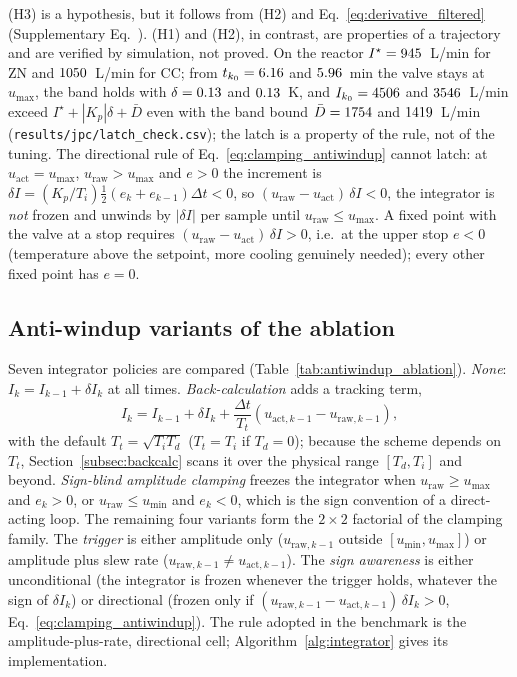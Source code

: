 (H3) is a hypothesis, but it follows from (H2) and Eq.~\eqref{eq:derivative_filtered} (Supplementary Eq.~). (H1) and (H2), in contrast, are properties of a trajectory and are verified by simulation, not proved. On the reactor $I^\star = 945$~L/min for ZN and $1050$~L/min for CC; from $t_{k_0} = 6.16$ and $5.96$~min the valve stays at $u_{\max}$, the band holds with $\delta = 0.13$ and $0.13$~K, and $I_{k_0} = 4506$ and $3546$~L/min exceed $I^\star + |K_p|\delta + \bar D$ even with the band bound $\bar D = 1754$ and $1419$~L/min (\texttt{results/jpc/latch\_check.csv}); the latch is a property of the rule, not of the tuning. The directional rule of Eq.~\eqref{eq:clamping_antiwindup} cannot latch: at $u_{\text{act}} = u_{\max}$, $u_{\text{raw}} > u_{\max}$ and $e > 0$ the increment is $\delta I = (K_p/T_i)\tfrac12(e_k + e_{k-1})\Delta t < 0$, so $(u_{\text{raw}} - u_{\text{act}})\,\delta I < 0$, the integrator is \emph{not} frozen and unwinds by $|\delta I|$ per sample until $u_{\text{raw}} \le u_{\max}$. A fixed point with the valve at a stop requires $(u_{\text{raw}} - u_{\text{act}})\,\delta I > 0$, i.e.\ at the upper stop $e < 0$ (temperature above the setpoint, more cooling genuinely needed); every other fixed point has $e = 0$.

\subsection{Anti-windup variants of the ablation}
\label{subsec:aw_variants}
Seven integrator policies are compared (Table~\ref{tab:antiwindup_ablation}). \emph{None}: $I_k = I_{k-1} + \delta I_k$ at all times. \emph{Back-calculation} \cite{astrom1989windup, galeani2009tutorial} adds a tracking term,
\begin{equation}
    I_k = I_{k-1} + \delta I_k + \frac{\Delta t}{T_t}\left(u_{\text{act},k-1} - u_{\text{raw},k-1}\right),
    \label{eq:back_calculation}
\end{equation}
with the default $T_t = \sqrt{T_i T_d}$ ($T_t = T_i$ if $T_d = 0$); because the scheme depends on $T_t$, Section~\ref{subsec:backcalc} scans it over the physical range $[T_d, T_i]$ and beyond. \emph{Sign-blind amplitude clamping} freezes the integrator when $u_{\text{raw}} \ge u_{\max}$ and $e_k > 0$, or $u_{\text{raw}} \le u_{\min}$ and $e_k < 0$, which is the sign convention of a direct-acting loop. The remaining four variants form the $2\times 2$ factorial of the clamping family. The \emph{trigger} is either amplitude only ($u_{\text{raw},k-1}$ outside $[u_{\min}, u_{\max}]$) or amplitude plus slew rate ($u_{\text{raw},k-1} \ne u_{\text{act},k-1}$). The \emph{sign awareness} is either unconditional (the integrator is frozen whenever the trigger holds, whatever the sign of $\delta I_k$) or directional (frozen only if $(u_{\text{raw},k-1} - u_{\text{act},k-1})\,\delta I_k > 0$, Eq.~\eqref{eq:clamping_antiwindup}). The rule adopted in the benchmark is the amplitude-plus-rate, directional cell; Algorithm~\ref{alg:integrator} gives its implementation.

